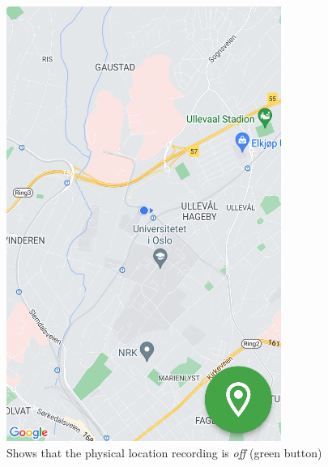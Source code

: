 \documentclass{article}
\begin{document}
\begin{figure}[H]
    \centering
    \begin{minipage}[c]{0.34\linewidth}
        \includegraphics[width=\linewidth]{graphics/recording_off.png}
        \caption{Shows that the physical location recording is \emph{off} (green button)}
        \label{fig:recording_off}
    \end{minipage}
    \hfill
    \begin{minipage}[c]{0.34\linewidth}

\end{minipage}
\end{figure}
\end{document}
